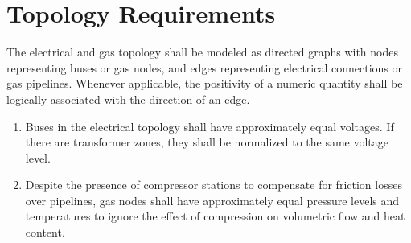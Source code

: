 \section{Topology Requirements}
The electrical and gas topology shall be modeled as directed graphs with nodes
representing buses or gas nodes, and edges representing electrical connections
or gas pipelines. Whenever applicable, the positivity of a numeric quantity
shall be logically associated with the direction of an edge.

\begin{enumerate}
\item Buses in the electrical topology shall have approximately equal
  voltages. If there are transformer zones, they shall be normalized to the same
  voltage level.

\item Despite the presence of compressor stations to compensate for friction
  losses over pipelines, gas nodes shall have approximately equal pressure
  levels and temperatures to ignore the effect of compression on volumetric flow
  and heat content.
\end{enumerate}
